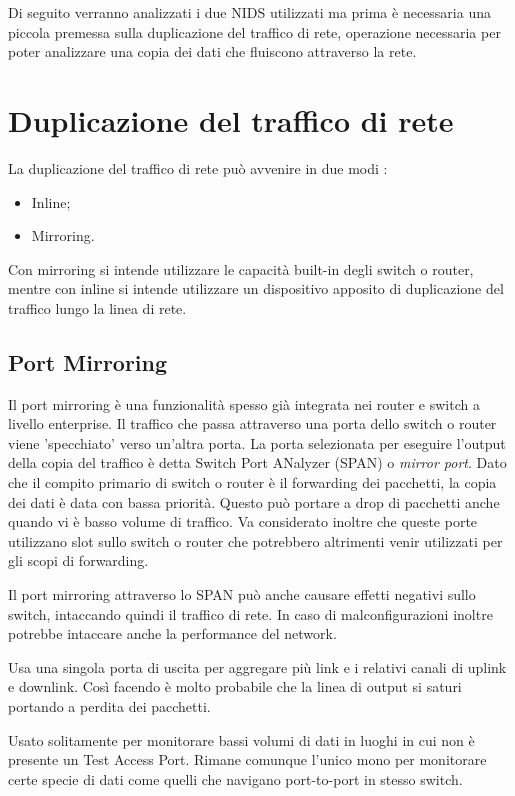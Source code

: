 Di seguito verranno analizzati i due NIDS utilizzati ma prima è necessaria una piccola premessa sulla duplicazione del traffico di rete, operazione necessaria per poter analizzare una copia dei dati che fluiscono attraverso la rete.
\section{Duplicazione del traffico di rete}
La duplicazione del traffico di rete può avvenire in due modi \cite{svoboda2015network}:
\begin{itemize}
    \item Inline;
    \item Mirroring.
\end{itemize}
Con mirroring si intende utilizzare le capacità built-in degli switch o router, mentre con inline si intende utilizzare un dispositivo apposito di duplicazione del traffico lungo la linea di rete.

\subsection{Port Mirroring}
Il port mirroring è una funzionalità spesso già integrata nei router e switch a livello enterprise. Il traffico che passa attraverso una porta dello switch o router viene 'specchiato' verso un'altra porta. La porta selezionata per eseguire l'output della copia del traffico è detta Switch Port ANalyzer (SPAN) o \textit{mirror port}. Dato che il compito primario di switch o router è il forwarding dei pacchetti, la copia dei dati è data con bassa priorità. Questo può portare a drop di pacchetti anche quando vi è basso volume di traffico. 
Va considerato inoltre che queste porte utilizzano slot sullo switch o router che potrebbero altrimenti venir utilizzati per gli scopi di forwarding.

Il port mirroring attraverso lo SPAN può anche causare effetti negativi sullo switch, intaccando quindi il traffico di rete. In caso di malconfigurazioni inoltre potrebbe intaccare anche la performance del network.

Usa una singola porta di uscita per aggregare più link e i relativi canali di uplink e downlink. Così facendo è molto probabile che la linea di output si saturi portando a perdita dei pacchetti.

Usato solitamente per monitorare bassi volumi di dati in luoghi in cui non è presente un Test Access Port. 
Rimane comunque l'unico mono per monitorare certe specie di dati come quelli che navigano port-to-port in stesso switch.



